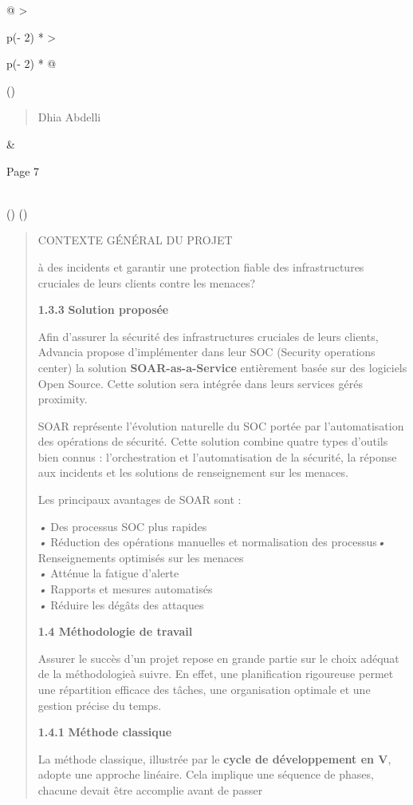 \documentclass[
]{article}
\begin{document}
\begin{longtable}[]{@{}
  >{\raggedright\arraybackslash}p{(\columnwidth - 2\tabcolsep) * }
  >{\raggedright\arraybackslash}p{(\columnwidth - 2\tabcolsep) * }@{}}
\toprule()
\begin{minipage}[b]{\linewidth}\raggedright
\begin{quote}
Dhia Abdelli
\end{quote}
\end{minipage} & \begin{minipage}[b]{\linewidth}\raggedright
Page 7
\end{minipage} \\
\midrule()
\endhead
\bottomrule()
\end{longtable}

\begin{quote}
CONTEXTE GÉNÉRAL DU PROJET

à des incidents et garantir une protection fiable des infrastructures
cruciales de leurs clients contre les menaces?

\textbf{1.3.3} \textbf{Solution proposée}

Afin d'assurer la sécurité des infrastructures cruciales de leurs
clients, Advancia propose d'implémenter dans leur SOC (Security
operations center) la solution \textbf{SOAR-as-a-Service} entièrement
basée sur des logiciels Open Source. Cette solution sera intégrée dans
leurs services gérés proximity.

SOAR représente l'évolution naturelle du SOC portée par l'automatisation
des opérations de sécurité. Cette solution combine quatre types d'outils
bien connus : l'orchestration et l'automatisation de la sécurité, la
réponse aux incidents et les solutions de renseignement sur les menaces.

Les principaux avantages de SOAR sont :

\emph{•} Des processus SOC plus rapides\\
\emph{•} Réduction des opérations manuelles et normalisation des
processus\emph{•} Renseignements optimisés sur les menaces\\
\emph{•} Atténue la fatigue d'alerte\\
\emph{•} Rapports et mesures automatisés\\
\emph{•} Réduire les dégâts des attaques

\textbf{1.4 Méthodologie de travail}

Assurer le succès d'un projet repose en grande partie sur le choix
adéquat de la méthodologieà suivre. En effet, une planification
rigoureuse permet une répartition efficace des tâches, une organisation
optimale et une gestion précise du temps.

\textbf{1.4.1} \textbf{Méthode classique}

La méthode classique, illustrée par le \textbf{cycle de développement en
V}, adopte une approche linéaire. Cela implique une séquence de phases,
chacune devait être accomplie avant de passer
\end{quote}
\end{document}
